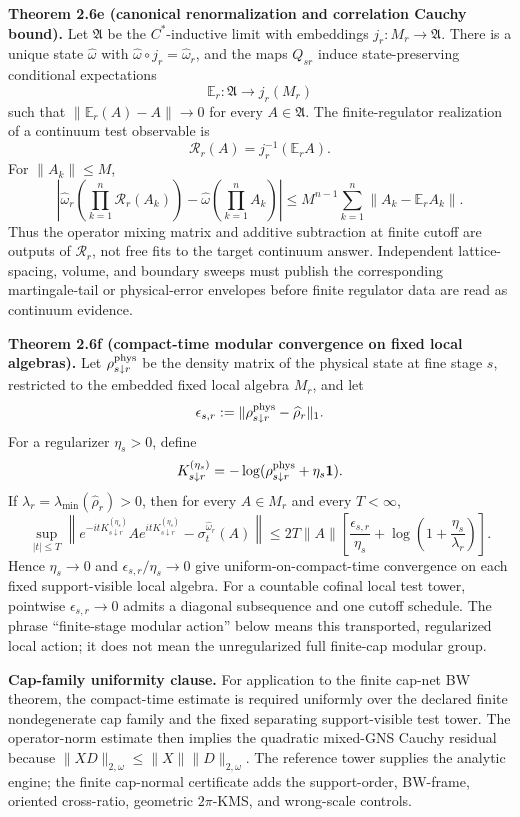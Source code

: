 \textbf{Theorem 2.6e (canonical renormalization and correlation Cauchy bound).}\label{thm:martingale-renormalization}
Let \(\mathfrak A\) be the \(C^\ast\)-inductive limit with embeddings \(j_r:M_r\to\mathfrak A\).
There is a unique state \(\widehat\omega\) with
\(\widehat\omega\circ j_r=\widehat\omega_r\), and the maps \(Q_{sr}\) induce
state-preserving conditional expectations
\[
\mathbb E_r:\mathfrak A\to j_r(M_r)
\]
such that \(\|\mathbb E_r(A)-A\|\to0\) for every \(A\in\mathfrak A\). The finite-regulator
realization of a continuum test observable is
\[
\mathcal R_r(A)=j_r^{-1}(\mathbb E_rA).
\]
For \(\|A_k\|\le M\),
\[
\left|
\widehat\omega_r\!\left(\prod_{k=1}^n\mathcal R_r(A_k)\right)
-
\widehat\omega\!\left(\prod_{k=1}^n A_k\right)
\right|
\le
M^{n-1}\sum_{k=1}^n\|A_k-\mathbb E_rA_k\|.
\]
Thus the operator mixing matrix and additive subtraction at finite cutoff are outputs of
\(\mathcal R_r\), not free fits to the target continuum answer. Independent lattice-spacing,
volume, and boundary sweeps must publish the corresponding martingale-tail or physical-error
envelopes before finite regulator data are read as continuum evidence.

\textbf{Theorem 2.6f (compact-time modular convergence on fixed local algebras).}\label{thm:compact-time-modular-convergence}
Let \(\rho^{\rm phys}_{s\downarrow r}\) be the density matrix of the physical state at fine stage
\(s\), restricted to the embedded fixed local algebra \(M_r\), and let
\[
\epsilon_{s,r}:=\|\rho^{\rm phys}_{s\downarrow r}-\widehat\rho_r\|_1 .
\]
For a regularizer \(\eta_s>0\), define
\[
K_{s\downarrow r}^{(\eta_s)}
=-\log(\rho^{\rm phys}_{s\downarrow r}+\eta_s\mathbf1).
\]
If \(\lambda_r=\lambda_{\min}(\widehat\rho_r)>0\), then for every \(A\in M_r\) and every
\(T<\infty\),
\[
\sup_{|t|\le T}
\left\|
e^{-itK_{s\downarrow r}^{(\eta_s)}}A e^{itK_{s\downarrow r}^{(\eta_s)}}
-
\sigma_t^{\widehat\omega_r}(A)
\right\|
\le
2T\|A\|
\left[
\frac{\epsilon_{s,r}}{\eta_s}
+\log\!\left(1+\frac{\eta_s}{\lambda_r}\right)
\right].
\]
Hence \(\eta_s\to0\) and \(\epsilon_{s,r}/\eta_s\to0\) give uniform-on-compact-time convergence
on each fixed support-visible local algebra. For a countable cofinal local test tower, pointwise
\(\epsilon_{s,r}\to0\) admits a diagonal subsequence and one cutoff schedule. The phrase
``finite-stage modular action'' below means this transported, regularized local action; it does
not mean the unregularized full finite-cap modular group.

\textbf{Cap-family uniformity clause.} For application to the finite cap-net BW theorem, the
compact-time estimate is required uniformly over the declared finite nondegenerate cap family and
the fixed separating support-visible test tower. The operator-norm estimate then implies the
quadratic mixed-GNS Cauchy residual because \(\|XD\|_{2,\omega}\le\|X\|\|D\|_{2,\omega}\). The
reference tower supplies the analytic engine; the finite cap-normal certificate adds the
support-order, BW-frame, oriented cross-ratio, geometric \(2\pi\)-KMS, and wrong-scale controls.

